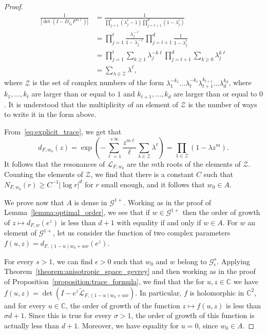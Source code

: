 \documentclass[AHL,Unicode,longabstracts,published]{cedram}
\newcommand{\p}[1]{\left(#1\right)}
\newcommand{\va}[1]{\left|#1\right|}
\newcommand{\clL}{\mathcal{L}}
\newcommand{\clG}{\mathcal{G}}
\newcommand{\clZ}{\mathcal{Z}}
\newcommand{\bbC}{\mathbb{C}}
\begin{document}
\begin{proof}
\begin{equation}\label{eq:explicit_trace}
\begin{split}
\frac{1}{\va{\det\p{I - D_{x_0} F^{m \ell}}}} & = \frac{1}{\prod_{j = 1}^t \left(\lambda_j^\ell - 1\right) \prod_{j = t+1}^{d} \left(1 - \lambda_j^{\ell}\right)} \\
& = \prod_{j = 1}^{t} \frac{\lambda_j^{- \ell} }{1 - \lambda_j^{- \ell}} \prod_{j = t+1}^{d} \frac{1}{1 - \lambda_j^t} \\
& = \prod_{j = 1}^t \sum_{k \geq 1} \lambda_j^{- k \ell} \prod_{j = t+1}^{d} \sum_{k \geq 0} \lambda_j^{k \ell} \\
& = \sum_{\lambda \in \clZ} \lambda^{\ell},
\end{split}
\end{equation}
where $\clZ$ is the set of complex numbers of the form $\lambda_1^{- k_1} \dots \lambda_{t}^{- k_t} \lambda_{t+1}^{k_{t+1}} \dots \lambda_d^{k_d}$, where $k_1, \dots, k_t$ are larger than or equal to $1$ and $k_{t+1},\dots,k_d$ are larger than or equal to $0$. It is understood that the multiplicity of an element of $\clZ$ is the number of ways to write it in the form above.

From~\eqref{eq:explicit_trace}, we get that
\begin{equation*}
d_{F,w_0}(z) = \exp\p{- \sum_{\ell = 1}^{+ \infty} \frac{z^{m \ell}}{\ell}\sum_{\lambda \in \clZ} \lambda^{\ell}} = \prod_{\lambda \in  \clZ}\left(1 - \lambda z^m\right).
\end{equation*}
It follows that the resonances of $\clL_{F,w_0}$ are the $m$th roots of the elements of $\clZ$. Counting the elements of $\clZ$, we find that there is a constant $C$ such that $N_{F,w_0}(r) \geq C^{-1} |\log r|^d$ for $r$ small enough, and it follows that $w_0 \in A$.

We prove now that $A$ is dense in $\clG^{1+}$. Working as in the proof of Lemma~\ref{lemma:optimal_order}, we see that if $w \in \clG^{1+}$ then the order of growth of $z \mapsto d_{F,w}(e^z)$ is less than $d+1$ with equality if and only if $w \in A$. For $w$ an element of $\clG^{1+}$, let us consider the function of two complex parameters $f(u,z) = d_{F, (1-u) w_0 + u w}(e^z)$.

For every $s > 1$, we can find $\epsilon > 0$ such that $w_0$ and $w$ belong to $\clG_{\epsilon}^s$. Applying Theorem~\ref{theorem:anisotropic_space_gevrey} and then working as in the proof of Proposition~\ref{proposition:trace_formula}, we find that the for $u,z \in \bbC$ we have $f(u,z) = \det\p{I - e^z \widetilde{\clL}_{F,(1-u) w_0 + u w}}$. In particular, $f$ is holomorphic in $\bbC^2$, and for every $u \in \bbC$, the order of growth of the function $z \mapsto f(u,z)$ is less than $\sigma d +1$. Since this is true for every $\sigma > 1$, the order of growth of this function is actually less than $d+1$. Moreover, we have equality for $u = 0$, since $w_0 \in A$.


\end{proof}
\end{document}
